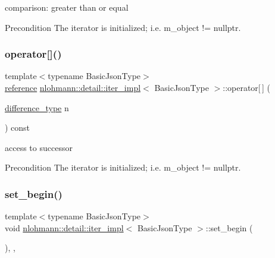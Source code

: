 comparison\+: greater than or equal 

\begin{DoxyPrecond}{Precondition}
The iterator is initialized; i.\+e. {\ttfamily m\+\_\+object != nullptr}. 
\end{DoxyPrecond}
\mbox{\label{classnlohmann_1_1detail_1_1iter__impl_ac0b9276f1102ed4b9cd3f5f56287e3ce}} 
\subsubsection{\texorpdfstring{operator[]()}{operator[]()}}
{\footnotesize\ttfamily template$<$typename Basic\+Json\+Type$>$ \\
\mbox{\hyperlink{classnlohmann_1_1detail_1_1iter__impl_a5be8001be099c6b82310f4d387b953ce}{reference}} \mbox{\hyperlink{classnlohmann_1_1detail_1_1iter__impl}{nlohmann\+::detail\+::iter\+\_\+impl}}$<$ Basic\+Json\+Type $>$\+::operator\mbox{[}$\,$\mbox{]} (\begin{DoxyParamCaption}\item[{\mbox{\hyperlink{classnlohmann_1_1detail_1_1iter__impl_a2f7ea9f7022850809c60fc3263775840}{difference\+\_\+type}}}]{n }\end{DoxyParamCaption}) const\hspace{0.3cm}{\ttfamily [inline]}}



access to successor 

\begin{DoxyPrecond}{Precondition}
The iterator is initialized; i.\+e. {\ttfamily m\+\_\+object != nullptr}. 
\end{DoxyPrecond}
\mbox{\label{classnlohmann_1_1detail_1_1iter__impl_a5d5f92c7f6848814bc82cf7e4e541820}} 
\subsubsection{\texorpdfstring{set\+\_\+begin()}{set\_begin()}}
{\footnotesize\ttfamily template$<$typename Basic\+Json\+Type$>$ \\
void \mbox{\hyperlink{classnlohmann_1_1detail_1_1iter__impl}{nlohmann\+::detail\+::iter\+\_\+impl}}$<$ Basic\+Json\+Type $>$\+::set\+\_\+begin (\begin{DoxyParamCaption}{ }\end{DoxyParamCaption})\hspace{0.3cm}{\ttfamily [inline]}, {\ttfamily [private]}, {\ttfamily [noexcept]}}



